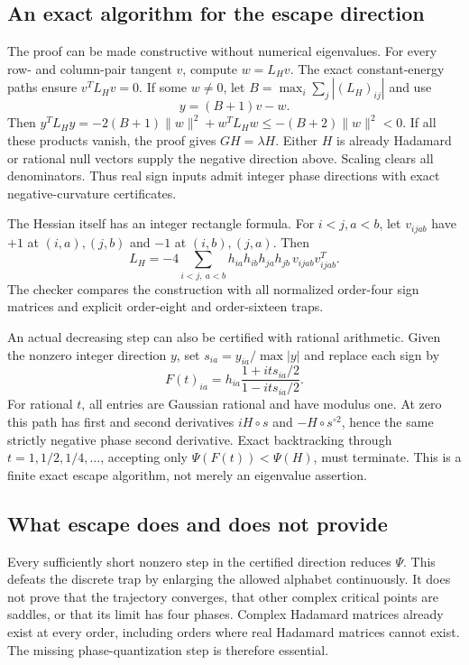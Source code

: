 \documentclass[11pt]{article}
\begin{document}
\subsection{An exact algorithm for the escape direction}
The proof can be made constructive without numerical eigenvalues.
For every row- and column-pair tangent $v$, compute $w=L_Hv$.
The exact constant-energy paths ensure $v^TL_Hv=0$.
If some $w\ne0$, let
$B=\max_i\sum_j|(L_H)_{ij}|$ and use
\[
 y=(B+1)v-w.
\]
Then
$y^TL_Hy=-2(B+1)\|w\|^2+w^TL_Hw
\le-(B+2)\|w\|^2<0$.
If all these products vanish, the proof gives $GH=\lambda H$.
Either $H$ is already Hadamard or rational null vectors supply
the negative direction above. Scaling clears all denominators.
Thus real sign inputs admit integer phase directions with exact
negative-curvature certificates.

The Hessian itself has an integer rectangle formula. For
$i<j,a<b$, let $v_{ijab}$ have $+1$ at $(i,a),(j,b)$ and
$-1$ at $(i,b),(j,a)$. Then
\[
 L_H=-4\sum_{i<j,\ a<b}
 h_{ia}h_{ib}h_{ja}h_{jb}\,v_{ijab}v_{ijab}^T.
\]
The checker compares the construction with all normalized order-four
sign matrices and explicit order-eight and order-sixteen traps.

An actual decreasing step can also be certified with rational
arithmetic. Given the nonzero integer direction $y$, set
$s_{ia}=y_{ia}/\max|y|$ and replace each sign by
\[
 F(t)_{ia}=h_{ia}\frac{1+it s_{ia}/2}{1-it s_{ia}/2}.
\]
For rational $t$, all entries are Gaussian rational and have modulus
one. At zero this path has first and second derivatives $iH\circ s$
and $-H\circ s^{\circ2}$, hence the same strictly negative phase
second derivative. Exact backtracking through $t=1,1/2,1/4,\ldots$,
accepting only $\Psi(F(t))<\Psi(H)$, must terminate. This is a
finite exact escape algorithm, not merely an eigenvalue assertion.

\subsection{What escape does and does not provide}
Every sufficiently short nonzero step in the certified direction
reduces $\Psi$. This defeats the discrete trap by enlarging the
allowed alphabet continuously. It does not prove that the trajectory
converges, that other complex critical points are saddles, or that its
limit has four phases. Complex Hadamard matrices already exist at
every order, including orders where real Hadamard matrices cannot exist.
The missing phase-quantization step is therefore essential.
\end{document}
